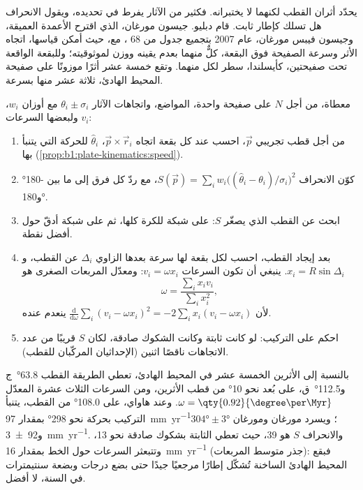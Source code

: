 يحدّد أثران القطب لكنهما لا يختبرانه. فكثير من الآثار يفرط في تحديده، ويقول الانحراف هل تسلك  كإطار ثابت. قام دبليو. جيسون مورغان، الذي اقترح الأعمدة العميقة، وجيسون فيبس مورغان، عام 2007 بتجميع جدول من 68 ، مع، حيث أمكن قياسها، اتجاه الأثر وسرعة الصفيحة فوق البقعة، كلٌّ منهما بعدم يقينه ووزن لموثوقيته؛ وللبقعة الواقعة تحت صفيحتين، كأيسلندا، سطر لكل منهما. وتقع خمسة عشر أثرًا موزونًا على صفيحة المحيط الهادئ، ثلاثة عشر منها بسرعة.

\begin{method}\label{met:b1:hotspots:pole-fit}
معطاة، من أجل $N$  على صفيحة واحدة، المواضع، واتجاهات الآثار $\theta_i \pm \sigma_i$ مع أوزان $w_i$، ولبعضها السرعات $v_i$:
\begin{enumerate}
  \item من أجل قطب تجريبي $\vec p$، احسب عند كل بقعة اتجاه $\vec p\times\vec r_i$،  $\hat\theta_i$ للحركة التي يتنبأ بها (\cref{prop:b1:plate-kinematics:speed}).
  \item كوّن الانحراف $S(\vec p) = \sum_i w_i\bigl((\hat\theta_i -
        \theta_i)/\sigma_i\bigr)^2$، مع ردّ كل فرق إلى ما بين \ang{-180} و\ang{180}.
  \item ابحث عن القطب الذي يصغّر $S$: على شبكة للكرة كلها، ثم على شبكة أدقّ حول أفضل نقطة.
  \item بعد إيجاد القطب، احسب لكل بقعة لها سرعة بعدها الزاوي $\Delta_i$ عن القطب، و$x_i = R\sin\Delta_i$. ينبغي أن تكون السرعات $v_i = \omega x_i$: ومعدّل المربعات الصغرى هو
        \[
          \omega = \frac{\sum_i x_i v_i}{\sum_i x_i^2},
        \]
لأن $\frac{\mathrm d}{\mathrm d\omega}\sum_i (v_i - \omega x_i)^2 =
        -2\sum_i x_i(v_i - \omega x_i)$ ينعدم عنده.
  \item احكم على التركيب: لو كانت  ثابتة وكانت الشكوك صادقة، لكان $S$ قريبًا من عدد الاتجاهات ناقصًا اثنين (الإحداثيان المركّبان للقطب).
\end{enumerate}
\end{method}

بالنسبة إلى الأثرين الخمسة عشر في المحيط الهادئ، تعطي الطريقة القطب \ang{63.8}~ج و\ang{112.5}~ق، على بُعد نحو \ang{10} من قطب الأثرين، ومن السرعات الثلاث عشرة المعدّل $\omega = \qty{0.92}{\degree\per\Myr}$. وعند هاواي، على \ang{108.0} من القطب، يتنبأ التركيب بحركة نحو \ang{298} بمقدار \qty{97}{mm.yr^{-1}}؛ ويسرد مورغان ومورغان $\ang{304}\pm\ang{3}$ و\qty[uncertainty-mode=separate]{92 \pm 3}{mm.yr^{-1}}. والانحراف $S$ هو 39، حيث تعطي  الثابتة بشكوك صادقة نحو 13، وتتبعثر السرعات حول الخط بمقدار \qty{16}{mm.yr^{-1}} (جذر متوسط المربعات): فبقع المحيط الهادئ الساخنة تُشكّل إطارًا مرجعيًا جيدًا حتى بضع درجات وبضعة سنتيمترات في السنة، لا أفضل.

